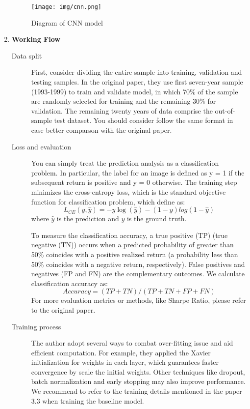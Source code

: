 \documentclass[11pt]{article}
\begin{document}
\begin{enumerate}
    \begin{figure}
        \centering
        \texttt{[image: img/cnn.png]}
        \caption{Diagram of CNN model}
        \label{cnn model}
    \end{figure}
    
    \item \textbf{Working Flow}
    
    \begin{description}
    \item[Data split] First, consider dividing the entire sample into training, validation and testing samples. In the original paper, they use first seven-year sample (1993-1999) to train and validate model, in which 70\% of the sample are randomly selected for training and the remaining 30\% for validation. The remaining twenty years of data  comprise the out-of-sample test dataset. You should consider follow the same format in case better comparson with the original paper.
    
    \item[Loss and evaluation] You can simply treat the prediction analysis as a classification problem. In particular, the label for an image is defined as y = 1 if the subsequent return is positive and y = 0 otherwise. The training step minimizes the cross-entropy loss, which is the standard objective function for classification problem, which define as:$$L_{CE}(y,\hat{y}) = -y\log(\hat{y}) - (1-y)log(1-\hat{y})$$ where $\hat{y}$ is the prediction and $y$ is the ground truth. 
    
    To measure the classification accuracy, a true positive (TP) (true negative (TN)) occurs when a predicted probability of greater than 50\% coincides with a positive realized return (a probability less than 50\% coincides with a negative return, respectively). False positives and negatives (FP and FN) are the complementary outcomes. We calculate classification accuracy as:$$Accuracy = (TP + TN)/(TP + TN + FP + FN)$$ For more evaluation metrics or methods, like Sharpe Ratio, please refer to the original paper.
    
    \item[Training process] The author adopt several ways to combat over-fitting issue and aid efficient computation. For example, they applied the Xavier initialization for weights in each layer, which guarantees faster convergence by scale the initial weights. Other techniques like dropout, batch normalization and early stopping may also improve performance. We recommend to refer to the training details mentioned in the paper 3.3 when training the baseline model.


\end{description}
\end{enumerate}
\end{document}
